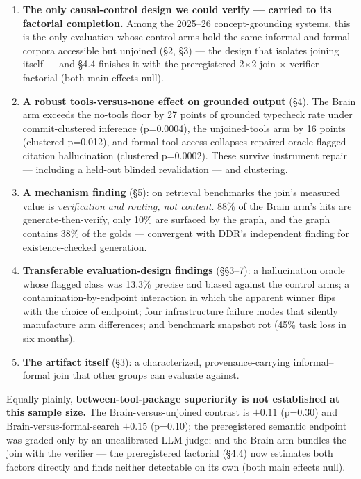 \documentclass[10pt]{article}
\begin{document}
\begin{enumerate}
\item \textbf{The only causal-control design we could verify --- carried
  to its factorial completion.} Among the
  2025--26 concept-grounding systems, this is the only evaluation whose
  control arms hold the same informal and formal corpora accessible but
  unjoined (\S 2, \S 3) --- the design that isolates joining itself ---
  and \S 4.4 finishes it with the preregistered 2$\times$2 join
  $\times$ verifier factorial (both main effects null).
\item \textbf{A robust tools-versus-none effect on grounded output}
  (\S 4). The Brain arm exceeds the no-tools floor by 27 points of
  grounded typecheck rate under commit-clustered inference (p=0.0004),
  the unjoined-tools arm by 16 points (clustered p=0.012), and
  formal-tool access collapses repaired-oracle-flagged citation
  hallucination (clustered p=0.0002). These survive instrument
  repair --- including a held-out blinded revalidation --- and
  clustering.
\item \textbf{A mechanism finding} (\S 5): on retrieval benchmarks the
  join's measured value is \emph{verification and routing, not content}.
  88\% of the Brain arm's hits are generate-then-verify, only 10\% are
  surfaced by the graph, and the graph contains 38\% of the golds ---
  convergent with DDR's independent finding for existence-checked
  generation.
\item \textbf{Transferable evaluation-design findings} (\S\S 3--7): a
  hallucination oracle whose flagged class was 13.3\% precise and biased
  against the control arms; a contamination-by-endpoint interaction in
  which the apparent winner flips with the choice of endpoint; four
  infrastructure failure modes that silently manufacture arm
  differences; and benchmark snapshot rot (45\% task loss in six
  months).
\item \textbf{The artifact itself} (\S 3): a characterized,
  provenance-carrying informal--formal join that other groups can
  evaluate against.
\end{enumerate}

Equally plainly, \textbf{between-tool-package superiority is not
established at this sample size.} The Brain-versus-unjoined contrast is
$+0.11$ (p=0.30) and Brain-versus-formal-search $+0.15$ (p=0.10); the
preregistered semantic endpoint was graded only by an uncalibrated LLM
judge; and the Brain arm bundles the join with the verifier --- the
preregistered factorial (\S 4.4) now estimates both factors directly
and finds neither detectable on its own (both main effects null).
\end{document}
